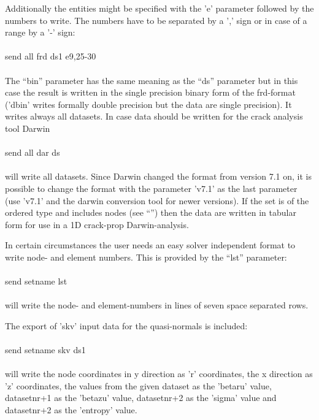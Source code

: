 \documentclass{article}
\begin{document}
Additionally the entities might be specified with the 'e' parameter followed by the numbers to write. The numbers have to be separated by a ',' sign or in case of a range by a '-' sign:\\\\send all frd ds1 e9,25-30\\\\ The ``bin'' parameter has the same meaning as the ``ds'' parameter but in this case the result is written in the single precision binary form of the frd-format ('dbin' writes formally double precision but the data are single precision). It writes always all datasets. In case data should be written for the crack analysis tool Darwin\\\\send all dar ds\\\\will write all datasets. Since Darwin changed the format from version 7.1 on, it is possible to change the format with the parameter 'v7.1' as the last parameter (use 'v7.1' and the darwin conversion tool for newer versions). If the set is of the ordered type and includes nodes (see ``'') then the data are written in tabular form for use in a 1D crack-prop Darwin-analysis.

In certain circumstances the user needs an easy solver independent format to write node- and element numbers. This is provided by the ``lst'' parameter:\\\\send setname lst\\\\will write the node- and element-numbers in lines of seven space separated rows.

The export of 'skv' input data for the quasi-normals is included:\\\\send setname skv ds1\\\\will write the node coordinates in y direction as 'r' coordinates, the x direction as 'z' coordinates, the values from the given dataset as the 'betaru' value, datasetnr+1  as the 'betazu' value, datasetnr+2  as the 'sigma' value and datasetnr+2  as the 'entropy' value.
\end{document}

